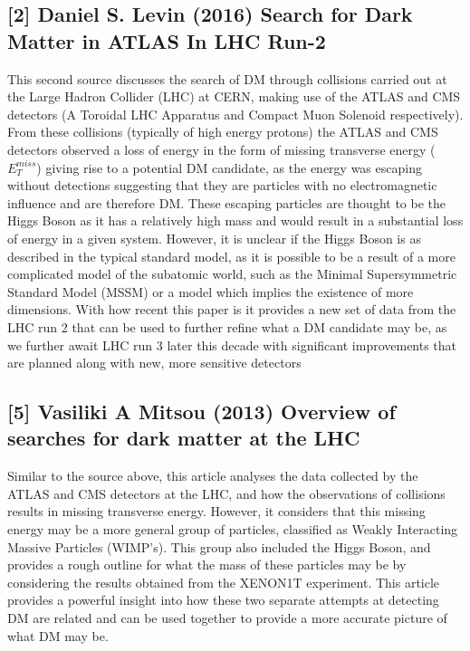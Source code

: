 \documentclass[]{article}
\begin{document}
\subsection*{[2] Daniel S. Levin (2016) Search for Dark Matter in ATLAS In LHC Run-2}
\parskip 0.2cm
This second source discusses the search of DM through collisions carried out at the Large 
Hadron Collider (LHC) at CERN, making use of the ATLAS and CMS detectors 
(A Toroidal LHC Apparatus and Compact Muon Solenoid respectively).
From these collisions (typically of high energy protons) the ATLAS and CMS detectors
observed a loss of energy in the form of missing transverse energy ($E^{miss}_{T} $)
giving rise to a potential DM candidate, as the energy was escaping without 
detections suggesting that they are particles with no electromagnetic influence 
and are therefore DM. These escaping particles are thought to be the Higgs Boson 
as it has a relatively high mass and would result in a substantial loss of energy
in a given system. However, it is unclear if the Higgs Boson is as 
described in the typical standard model, as it is possible to be a result of a more 
complicated model of the subatomic world, such as the Minimal Supersymmetric Standard Model (MSSM)
or a model which implies the existence of more dimensions. With how recent this paper 
is it provides a new set of data from the LHC run 2 that can be used to further refine 
what a DM candidate may be, as we further await LHC run 3 later this decade with 
significant improvements that are planned along with new, more sensitive detectors\parskip 0.2cm 

\noindent 

 
\subsection*{[5] Vasiliki A Mitsou (2013) Overview of searches for dark matter at the LHC}
\parskip 0.2cm
Similar to the source above, this article analyses the data collected by the
ATLAS and CMS detectors at the LHC, and how the observations of collisions results in
missing transverse energy. However, it considers that this missing energy may be
a more general group of particles, classified as Weakly Interacting Massive Particles (WIMP's).
This group also included the Higgs Boson, and provides a rough outline for what 
the mass of these particles may be by considering the results obtained 
from the XENON1T experiment. This article provides a powerful insight into how these
two separate attempts at detecting DM are related and can be used together 
to provide a more accurate picture of what DM may be.
\end{document}
